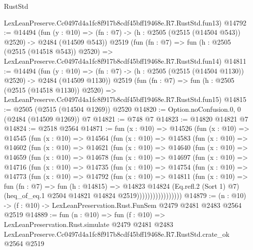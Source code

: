 \begin{lexlean}{RustStd}
\begin{coremodule}
    LexLeanPreserve.Cc0497d4a1fc8f917b8cdf45bff19468e.R7.RustStd.fun13)
@14792 := @14494
    (fun (y : @10) => (fn : @7) -> (h : @2505 (@2515 (@14504 @543)) @2520) -> @2484 (@14509 @543))
    @2519
    (fun (fn : @7) =>
    fun (h : @2505 (@2515 (@14518 @543)) @2520) =>
    LexLeanPreserve.Cc0497d4a1fc8f917b8cdf45bff19468e.R7.RustStd.fun14)
@14811 := @14494
    (fun (y : @10) => (fn : @7) -> (h : @2505 (@2515 (@14504 @1130)) @2520) -> @2484 (@14509 @1130))
    @2519
    (fun (fn : @7) =>
    fun (h : @2505 (@2515 (@14518 @1130)) @2520) =>
    LexLeanPreserve.Cc0497d4a1fc8f917b8cdf45bff19468e.R7.RustStd.fun15)
@14815 := @2505 (@2515 (@14504 @1269)) @2520
@14820 := Option.noConfusion.{0, 0} (@2484 (@14509 @1269)) @7
@14821 := @748 @7
@14823 := @14820 @14821 @7
@14824 := @2518 @2564
@14871 := fun (x : @10) =>
  @14526
    (fun (x : @10) =>
    @14545
      (fun (x : @10) =>
      @14564
        (fun (x : @10) =>
        @14583
          (fun (x : @10) =>
          @14602
            (fun (x : @10) =>
            @14621
              (fun (x : @10) =>
              @14640
                (fun (x : @10) =>
                @14659
                  (fun (x : @10) =>
                  @14678
                    (fun (x : @10) =>
                    @14697
                      (fun (x : @10) =>
                      @14716
                        (fun (x : @10) =>
                        @14735
                          (fun (x : @10) =>
                          @14754
                            (fun (x : @10) =>
                            @14773
                              (fun (x : @10) =>
                              @14792
                                (fun (x : @10) =>
                                @14811
                                  (fun (x : @10) =>
                                  fun (fn : @7) =>
                                  fun (h : @14815) =>
                                  @14823
                                    @14824
                                    (Eq.refl.{2} (Sort 1) @7)
                                    (heq_of_eq.{1} @2504 @14821 @14824 @2519)))))))))))))))))
@14879 := (n : @10) -> (f : @10) -> LexLeanPreservation.Rust.FunSem @2479 @2481 @2483 @2564 @2519
@14889 := fun (n : @10) =>
  fun (f : @10) =>
  LexLeanPreservation.Rust.simulate
    @2479
    @2481
    @2483
    LexLeanPreserve.Cc0497d4a1fc8f917b8cdf45bff19468e.R7.RustStd.crate_ok
    @2564
    @2519
\end{coremodule}
\end{lexlean}
